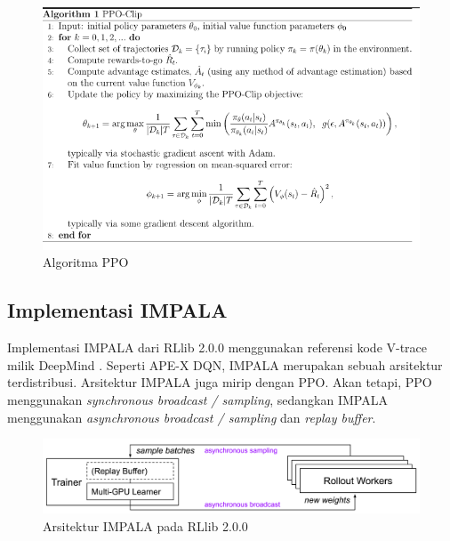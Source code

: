 \begin{figure}[H]
  \centering
    \includegraphics[scale=0.9]{gambar/ppo_algorithm.png}
    \caption{Algoritma PPO \citep{ppo}}
    \label{fig:ppoAlgorithm}
\end{figure}

\subsection{Implementasi IMPALA}
Implementasi IMPALA dari RLlib 2.0.0 menggunakan referensi kode V-trace milik DeepMind \citep{impala}.
Seperti APE-X DQN, IMPALA merupakan sebuah arsitektur terdistribusi. Arsitektur IMPALA juga mirip dengan PPO.
Akan tetapi, PPO menggunakan \emph{synchronous broadcast / sampling}, sedangkan IMPALA menggunakan \emph{asynchronous broadcast / sampling} dan \emph{replay buffer}.

\begin{figure}[H]
  \centering
    \includegraphics[scale=0.62]{gambar/rllib_impala_architecture.png}
    \caption{Arsitektur IMPALA pada RLlib 2.0.0 \citep{rllibDocumentation}}
    \label{fig:rllib_impala_architecture}
\end{figure}

